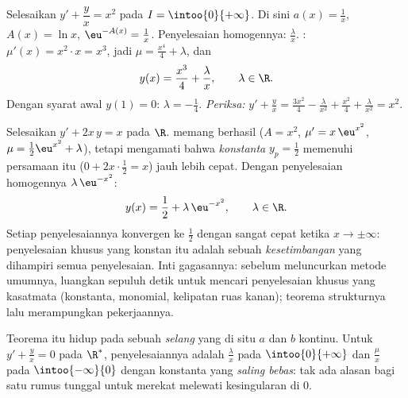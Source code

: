 \begin{example}\label{ex:b1:diffeq:order1}
Selesaikan $y' + \dfrac{y}{x} = x^2$ pada $I = \intoo{0}{+\infty}$. Di sini
$a(x) = \frac 1x$, $A(x) = \ln x$, $\eu^{-A(x)} = \frac 1x$.
Penyelesaian homogennya: $\frac{\lambda}{x}$. :
$\mu'(x) = x^2 \cdot x = x^3$, jadi $\mu = \frac{x^4}{4} + \lambda$, dan
\[
y(x) = \frac{x^3}{4} + \frac{\lambda}{x}, \qquad \lambda \in \R .
\]
Dengan syarat awal $y(1) = 0$: $\lambda = -\frac14$.
\emph{Periksa:} $y' + \frac yx = \frac{3x^2}{4} - \frac{\lambda}{x^2} +
\frac{x^2}{4} + \frac{\lambda}{x^2} = x^2$.
\end{example}

\begin{example}\label{ex:b1:diffeq:guess}
Selesaikan $y' + 2x\,y = x$ pada $\R$.  memang berhasil ($A =
x^2$, $\mu' = x\,\eu^{x^2}$, $\mu = \frac12\eu^{x^2} + \lambda$),
tetapi mengamati bahwa \emph{konstanta} $y_p = \frac12$ memenuhi
persamaan itu ($0 + 2x\cdot\frac12 = x$) jauh lebih cepat. Dengan
penyelesaian homogennya $\lambda\,\eu^{-x^2}$:
\[
y(x) = \frac12 + \lambda\,\eu^{-x^2}, \qquad \lambda \in \R .
\]
Setiap penyelesaiannya konvergen ke $\frac12$ dengan sangat cepat ketika $x \to
\pm\infty$: penyelesaian khusus yang konstan itu adalah sebuah
\emph{kesetimbangan} yang dihampiri semua penyelesaian. Inti gagasannya: sebelum
meluncurkan metode umumnya, luangkan sepuluh detik untuk mencari
penyelesaian khusus yang kasatmata (konstanta, monomial, kelipatan
ruas kanan); teorema strukturnya lalu merampungkan pekerjaannya.
\end{example}

\begin{remark}
Teorema itu hidup pada sebuah \emph{selang} yang di situ $a$ dan $b$
kontinu. Untuk $y' + \frac yx = 0$ pada $\R^*$, penyelesaiannya adalah
$\frac{\lambda}{x}$ pada $\intoo{0}{+\infty}$ dan
$\frac{\mu}{x}$ pada $\intoo{-\infty}{0}$ dengan konstanta yang
\emph{saling bebas}: tak ada alasan bagi satu rumus tunggal untuk merekat melewati
kesingularan di $0$.
\end{remark}

